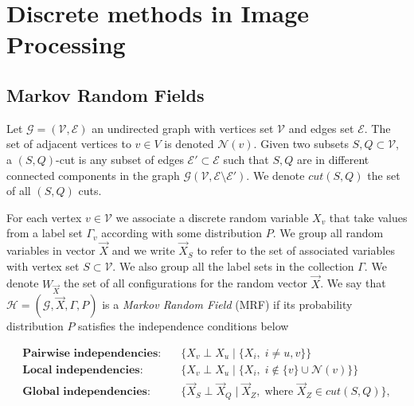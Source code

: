 \chapter{Discrete methods in Image Processing}
\label{chapter:discrete-methods-in-image-processing}

\section{Markov Random Fields}
\label{ch2:sec:markov-random-fields}

Let $\mathcal{G}=(\mathcal{V},\mathcal{E})$ an undirected graph with vertices set $\mathcal{V}$ and edges set $\mathcal{E}$. The set of adjacent vertices to $v \in V$ is denoted $\mathcal{N}(v)$. Given two subsets $S,Q \subset \mathcal{V}$, a $(S,Q)$-cut is any subset of edges $\mathcal{E}' \subset \mathcal{E}$ such that $S,Q$ are in different connected components in the graph $\mathcal{G}(\mathcal{V},\mathcal{E} \setminus \mathcal{E}')$. We denote $cut(S,Q)$ the set of all $(S,Q)$ cuts.

For each vertex $v \in \mathcal{V}$ we associate a discrete random variable $X_v$ that take values from a label set $\Gamma_v$ according with some distribution $P$. We group all random variables in vector $\vec{X}$ and we write $\vec{X}_S$ to refer to the set of associated variables with vertex set $S \subset \mathcal{V}$. We also group all the label sets in the collection $\Gamma$. We denote $W_{\vec{X}}$ the set of all configurations for the random vector $\vec{X}$. We say that $\mathcal{H} =(\mathcal{G},\vec{X},\Gamma,P)$ is a \emph{Markov Random Field} (MRF) if its probability distribution $P$  satisfies the independence conditions below

\begin{align}
	\textbf{Pairwise independencies:}&\quad \Big\{ X_v \perp X_u \;|\; \big\{X_i,\; i \neq u,v \big\}  \Big\} \label{ch2:eq:markov-pairwise-independencies}   \\
	\textbf{Local independencies:}&\quad \Big\{ X_v \perp X_u \;|\; \big\{X_i, \; i \notin \{v\}  \cup \mathcal{N}(v)  \big\} \Big\} \label{ch2:eq:markov-local-independencies} \\
	\textbf{Global independencies:}& \quad \Big\{ \vec{X}_S \perp \vec{X}_Q \;|\; \vec{X}_Z,\; \text{where } \vec{X}_Z \in cut(S,Q) \Big\} \label{ch2:eq:markov-global-independencies},
\end{align}

